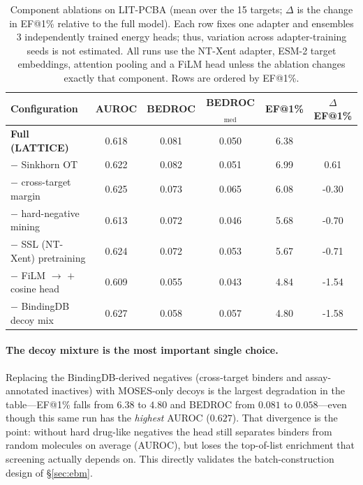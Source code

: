 \documentclass[10pt]{article}
\newcommand{\nSeeds}{3}\newcommand{\nViews}{4}\newcommand{\bedrocAlpha}{80.5}
\begin{document}
\begin{table}[H]\centering
  \caption{Component ablations on LIT-PCBA (mean over the 15 targets;
  $\Delta$ is the change in EF@1\% relative to the full model). Each row fixes
  one adapter and ensembles \nSeeds{} independently trained energy heads; thus,
  variation across adapter-training seeds is not estimated.
  All runs use the NT-Xent adapter, ESM-2 target embeddings, attention pooling and
  a FiLM head unless the ablation changes exactly that component. Rows are ordered
  by EF@1\%.}
  \label{tab:ablation}\small\setlength{\tabcolsep}{6pt}
  \begin{tabular}{l S[table-format=1.3] S[table-format=1.3] S[table-format=1.3] S[table-format=1.2] S[table-format=+1.2]}
    \toprule
    Configuration & {AUROC} & {BEDROC} & {BEDROC$_{\text{med}}$} & {EF@1\%} & {$\Delta$EF@1\%} \\
    \midrule
    \textbf{Full (LATTICE)}        & 0.618 & 0.081 & 0.050 & 6.38 & {\;} \\
    \midrule
    $-$ Sinkhorn OT                & 0.622 & 0.082 & 0.051 & 6.99 & 0.61 \\
    $-$ cross-target margin        & 0.625 & 0.073 & 0.065 & 6.08 & -0.30 \\
    $-$ hard-negative mining       & 0.613 & 0.072 & 0.046 & 5.68 & -0.70 \\
    $-$ SSL (NT-Xent) pretraining  & 0.624 & 0.072 & 0.053 & 5.67 & -0.71 \\
    $-$ FiLM $\rightarrow$ $+$cosine head & 0.609 & 0.055 & 0.043 & 4.84 & -1.54 \\
    $-$ BindingDB decoy mix        & 0.627 & 0.058 & 0.057 & 4.80 & -1.58 \\
    \bottomrule
  \end{tabular}
\end{table}

\paragraph{The decoy mixture is the most important single choice.}
Replacing the BindingDB-derived negatives (cross-target binders and
assay-annotated inactives) with MOSES-only decoys is the largest degradation in
the table---EF@1\% falls from $6.38$ to $4.80$ and BEDROC from $0.081$ to
$0.058$---even though this same run has the \emph{highest} AUROC ($0.627$). That
divergence is the point: without hard drug-like negatives the head still separates
binders from random molecules on average (AUROC), but loses the top-of-list
enrichment that screening actually depends on. This directly validates the
batch-construction design of \S\ref{sec:ebm}.
\end{document}
